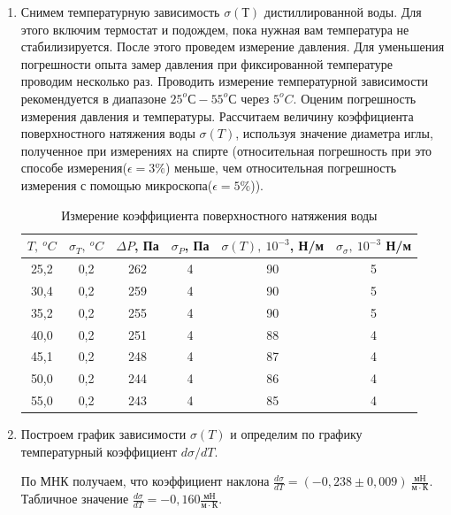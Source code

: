 \documentclass[12pt,a4paper]{article}
\begin{document}
\begin{enumerate}
    \item Снимем температурную зависимость $\sigma (Т)$ дистиллированной воды. 
    Для этого включим термостат и подождем, пока нужная вам температура не стабилизируется. 
    После этого проведем измерение давления. 
    Для уменьшения погрешности опыта замер давления при фиксированной температуре проводим несколько раз. 
    Проводить измерение температурной зависимости  рекомендуется в диапазоне  $25^oС - 55^oС$ через $5^oC$. Оценим погрешность измерения давления и температуры. Рассчитаем величину коэффициента поверхностного натяжения воды $\sigma (T)$, используя значение диаметра иглы, полученное при измерениях на спирте (относительная погрешность при это способе измерения($\epsilon=3\%$) меньше, чем относительная погрешность измерения с помощью микроскопа($\epsilon=5\%$)). 
      \begin{table}[ht]
        \centering
        \begin{tabular}{|c|c|c|c|c|c|}
        \hline
            $T,\ ^oC$ & $\sigma_T,\ ^oC$ & $\Delta P$, Па & $\sigma_P$, Па & $\sigma(T),\ 10^{-3}$, Н/м & $\sigma_{\sigma},\ 10^{-3}$ Н/м\\
            \hline
            25,2 & 0,2& 262 & 4&90 & 5\\
            \hline
            30,4 & 0,2& 259 & 4&90& 5\\
            \hline
            35,2 & 0,2& 255 & 4& 90& 5\\
            \hline
            40,0 & 0,2& 251&4 & 88& 4\\
            \hline
            45,1 & 0,2& 248 &4 & 87& 4\\
            \hline
            50,0 & 0,2& 244 & 4& 86& 4\\
            \hline
            55,0 &0,2&243 & 4& 85& 4\\
            \hline
        \end{tabular}
        \caption{Измерение коэффициента поверхностного натяжения воды}
    \end{table}
    
    \item Построем график зависимости $\sigma (T)$ и определим по графику температурный коэффициент $d\sigma / d T$. 
    
    По МНК получаем, что коэффициент наклона $\frac {d\sigma}{dT} = (-0,238\pm 0,009)\ \frac {мН}{м\cdot К}$. Табличное значение $\frac {d\sigma}{dT} = -0,160 \frac {мН}{м\cdot К}$.
    

\end{enumerate}
\end{document}
